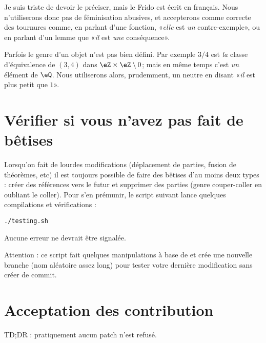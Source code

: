 Je suis triste de devoir le préciser, mais le Frido est écrit en français. Nous n'utiliserons donc pas de féminisation abusives, et accepterons comme correcte des tournures comme, en parlant d'une fonction, «\emph{elle} est \emph{un} contre-exemple», ou en parlant d'un lemme que «\emph{il} est \emph{une} conséquence».

Parfois le genre d'un objet n'est pas bien défini. Par exemple \( 3/4\) est \emph{la} classe d'équivalence de \( (3,4)\) dans \( \eZ\times \eZ\setminus{0}\); mais en même temps c'est \emph{un} élément de \( \eQ\). Nous utiliserons alors, prudemment, un neutre en disant «\emph{il} est plus petit que \( 1\)».

\section{Vérifier si vous n'avez pas fait de bêtises}

Lorsqu'on fait de lourdes modifications (déplacement de parties, fusion de théorèmes, etc) il est toujours possible de faire des bêtises d'au moins deux types : créer des références vers le futur et supprimer des parties (genre couper-coller en oubliant le coller). Pour s'en prémunir, le script suivant lance quelques compilations et vérifications :

\begin{verbatim}
./testing.sh
\end{verbatim}
Aucune erreur ne devrait être signalée.

Attention : ce script fait quelques manipulations à base de  et crée une nouvelle branche (nom aléatoire assez long) pour tester votre dernière modification sans créer de commit.

\section{Acceptation des contribution}

TD;DR : pratiquement aucun patch n'est refusé.

